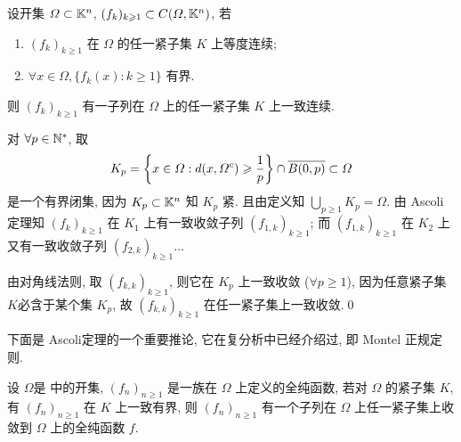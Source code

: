      \begin{Corollary}
          设开集 $ \varOmega\subset\K^{n} $,  $ (f_{k})_{k\geqslant1}\subset C(\varOmega, \K^{n}) $, 若
          \begin{enumerate}[(1)]
               \item $ (f_{k})_{k\geqslant1} $ 在 $ \varOmega $ 的任一紧子集 $ K $ 上等度连续;
               \item $ \forall x\in\varOmega, \{ f_{k}(x):k\geqslant1 \} $ 有界.
          \end{enumerate} 
          则 $ (f_{k})_{k\geqslant1} $ 有一子列在 $ \varOmega $ 上的任一紧子集 $ K $ 上一致连续.
     \end{Corollary}
     
     \begin{Proof}
          对 $ \forall p\in\N^{*} $, 取
          \[
               K_{p}=\left\{ x\in\varOmega: d(x, \varOmega^{c})\geqslant\frac{1}{p} \right\}\cap \baro{B(0, p)}\subset\varOmega  
          \]
          是一个有界闭集, 因为 $ K_{p}\subset\K^{n} $ 知 $ K_{p} $ 紧. 且由定义知 $ \bigcup_{p\geqslant1}K_{p}=\varOmega $. 由 Ascoli定理知 $ (f_{k})_{k\geqslant1} $ 在 $ K_{1} $ 上有一致收敛子列 $ (f_{1, k})_{k\geqslant1} $; 而 $ (f_{1, k})_{k\geqslant1} $ 在 $ K_{2} $ 上又有一致收敛子列 $ (f_{2, k})_{k\geqslant1}\dots $

          由对角线法则, 取 $ (f_{k, k})_{k\geqslant1} $, 则它在 $ K_{p} $ 上一致收敛 ($ \forall p\geqslant1 $), 因为任意紧子集$ K $必含于某个集 $ K_{p} $, 故 $ (f_{k, k})_{k\geqslant1} $ 在任一紧子集上一致收敛.\qed
     \end{Proof}

     下面是 Ascoli定理的一个重要推论, 它在复分析中已经介绍过, 即 Montel 正规定则.

     \begin{Theorem}[Montel]
          设 $ \varOmega $是 \C 中的开集, $ (f_{n})_{n\geqslant1} $ 是一族在 $ \varOmega $ 上定义的全纯函数, 若对 $ \varOmega $ 的紧子集 $ K $, 有 $ (f_{n})_{n\geqslant1} $ 在 $ K $ 上一致有界, 则 $ (f_{n})_{n\geqslant1} $ 有一个子列在 $ \varOmega $ 上任一紧子集上收敛到 $ \varOmega $ 上的全纯函数 $ f $.
     \end{Theorem}

